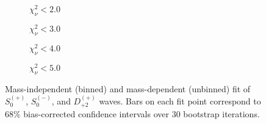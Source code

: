 \begin{figure}[htbp]
    \centering
    \begin{subfigure}{0.45\textwidth}
        
        \caption{$\chi^2_\nu < 2.0$}
    \end{subfigure}
    \hfill
    \begin{subfigure}{0.45\textwidth}
        
        \caption{$\chi^2_\nu < 3.0$}
    \end{subfigure}
    \vspace{1em}
    \begin{subfigure}{0.45\textwidth}
        
        \caption{$\chi^2_\nu < 4.0$}
    \end{subfigure}
    \hfill
    \begin{subfigure}{0.45\textwidth}
        
        \caption{$\chi^2_\nu < 5.0$}
    \end{subfigure}

    \caption{Mass-independent (binned) and mass-dependent (unbinned) fit of $S_{0}^{(+)}$, $S_{0}^{(-)}$, and $D_{+2}^{(+)}$ waves. Bars on each fit point correspond to $68\%$ bias-corrected confidence intervals over $ 30 $ bootstrap iterations.}
    \label{fig:unbinned-fit-all-Spn-D2p}
\end{figure}

